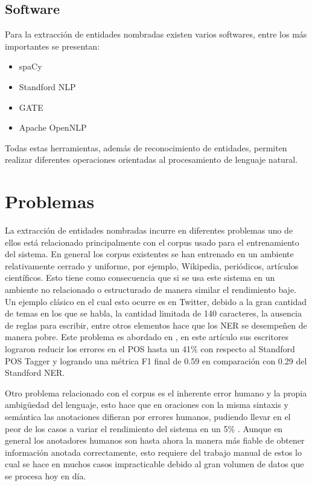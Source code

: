 \documentclass[runningheads]{llncs}
\begin{document}
\subsection{Software}

Para la extracción de entidades nombradas existen varios softwares, entre los más importantes se presentan:

\begin{itemize}

\item spaCy \cite{spacy_nlp}
\item Standford NLP \cite{standford_nlp}
\item GATE \cite{gate_nlp}
\item Apache OpenNLP \cite{open_nlp}

\end{itemize}

Todas estas herramientas, además de reconocimiento de entidades, permiten realizar diferentes operaciones orientadas al procesamiento de lenguaje natural.

\section{Problemas}

La extracción de entidades nombradas incurre en diferentes problemas uno de ellos está relacionado principalmente con el corpus usado para el entrenamiento del sistema. En general los corpus existentes se han entrenado en un ambiente relativamente cerrado y uniforme, por ejemplo, Wikipedia, periódicos, artículos científicos. Esto tiene como consecuencia que si se usa este sistema en un ambiente no relacionado o estructurado de manera similar el rendimiento baje. Un ejemplo clásico en el cual esto ocurre es en Twitter, debido a la gran cantidad de temas en los que se habla, la cantidad limitada de 140 caracteres, la ausencia de reglas para escribir,  entre otros elementos hace que los NER se desempeñen de manera pobre. Este problema es abordado en \cite{tweeter}, en este artículo sus escritores lograron reducir los errores en el POS hasta un 41\% con respecto al Standford POS Tagger y logrando una métrica F1 final de 0.59 en comparación con 0.29 del Standford NER.

Otro problema relacionado con el corpus es el inherente error humano y la propia ambigüedad del lenguaje, esto hace que en oraciones con la misma sintaxis y semántica las anotaciones difieran por errores humanos, pudiendo llevar en el peor de los casos a variar el rendimiento del sistema en un 5\% \cite{posdecisiontree}. Aunque en general los anotadores humanos son hasta ahora la manera más fiable de obtener información anotada correctamente, esto requiere del trabajo manual de estos lo cual se hace en muchos casos impracticable debido al gran volumen de datos que se procesa hoy en día.
\end{document}
